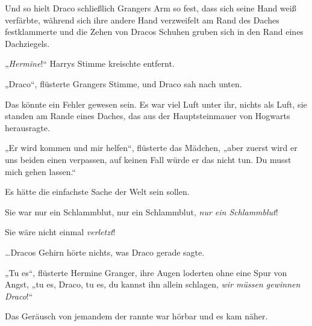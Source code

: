 Und so hielt Draco schließlich Grangers Arm so fest, dass sich seine Hand weiß verfärbte, während sich ihre andere Hand verzweifelt am Rand des Daches festklammerte und die Zehen von Dracos Schuhen gruben sich in den Rand eines Dachziegels.

„\emph{Hermine}!“ Harrys Stimme kreischte entfernt.

„Draco“, flüsterte Grangers Stimme, und Draco sah nach unten.

Das könnte ein Fehler gewesen sein. Es war viel Luft unter ihr, nichts als Luft, sie standen am Rande eines Daches, das aus der Hauptsteinmauer von Hogwarts herausragte.

„Er wird kommen und mir helfen“, flüsterte das Mädchen, „aber zuerst wird er uns beiden einen  verpassen, auf keinen Fall würde er das nicht tun. Du musst mich gehen lassen.“

Es hätte die einfachste Sache der Welt sein sollen.

Sie war nur ein Schlammblut, nur ein Schlammblut, \emph{nur ein Schlammblut}!

Sie wäre nicht einmal \emph{verletzt}!

…Dracos Gehirn hörte nichts, was Draco gerade sagte.

„Tu es“, flüsterte Hermine Granger, ihre Augen loderten ohne eine Spur von Angst, „tu es, Draco, tu es, du kannst ihn allein schlagen, \emph{wir müssen gewinnen Draco}!“

Das Geräusch von jemandem der rannte war hörbar und es kam näher.

